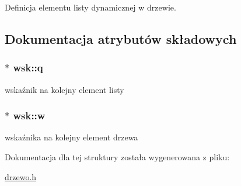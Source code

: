 Definicja elementu listy dynamicznej w drzewie. 

\subsection{Dokumentacja atrybutów składowych}
\subsubsection[{\texorpdfstring{q}{q}}]{$\ast$ wsk\+::q}\hypertarget{structwsk_a5957f1d185b541d7572b8d9a11a8bf7d}{}\label{structwsk_a5957f1d185b541d7572b8d9a11a8bf7d}


wskaźnik na kolejny element listy 

\subsubsection[{\texorpdfstring{w}{w}}]{$\ast$ wsk\+::w}\hypertarget{structwsk_a69da68a1f76055e88538302c86ec7ac6}{}\label{structwsk_a69da68a1f76055e88538302c86ec7ac6}


wskaźnika na kolejny element drzewa 



Dokumentacja dla tej struktury została wygenerowana z pliku\+:\begin{DoxyCompactItemize}
\item 
\hyperlink{drzewo_8h}{drzewo.\+h}\end{DoxyCompactItemize}
